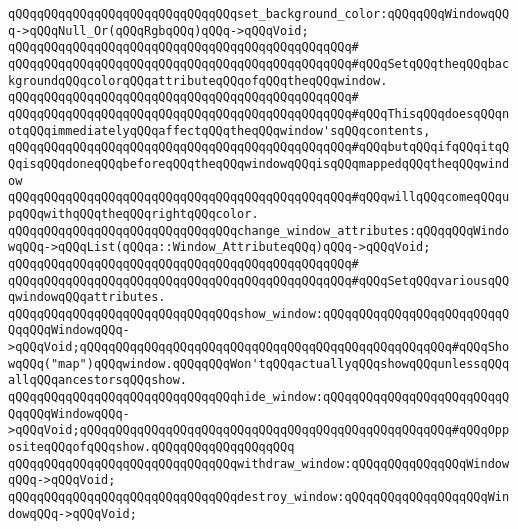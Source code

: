 \newline
\verb|qQQqqQQqqQQqqQQqqQQqqQQqqQQqqQQqset_background_color:qQQqqQQqWindowqQQq->qQQqNull_Or(qQQqRgbqQQq)qQQq->qQQqVoid;|\newline
\verb|qQQqqQQqqQQqqQQqqQQqqQQqqQQqqQQqqQQqqQQqqQQqqQQq#|\newline
\verb|qQQqqQQqqQQqqQQqqQQqqQQqqQQqqQQqqQQqqQQqqQQqqQQq#qQQqSetqQQqtheqQQqbackgroundqQQqcolorqQQqattributeqQQqofqQQqtheqQQqwindow.|\newline
\verb|qQQqqQQqqQQqqQQqqQQqqQQqqQQqqQQqqQQqqQQqqQQqqQQq#|\newline
\verb|qQQqqQQqqQQqqQQqqQQqqQQqqQQqqQQqqQQqqQQqqQQqqQQq#qQQqThisqQQqdoesqQQqnotqQQqimmediatelyqQQqaffectqQQqtheqQQqwindow'sqQQqcontents,|\newline
\verb|qQQqqQQqqQQqqQQqqQQqqQQqqQQqqQQqqQQqqQQqqQQqqQQq#qQQqbutqQQqifqQQqitqQQqisqQQqdoneqQQqbeforeqQQqtheqQQqwindowqQQqisqQQqmappedqQQqtheqQQqwindow|\newline
\verb|qQQqqQQqqQQqqQQqqQQqqQQqqQQqqQQqqQQqqQQqqQQqqQQq#qQQqwillqQQqcomeqQQqupqQQqwithqQQqtheqQQqrightqQQqcolor.|\newline
\newline
\newline
\verb|qQQqqQQqqQQqqQQqqQQqqQQqqQQqqQQqchange_window_attributes:qQQqqQQqWindowqQQq->qQQqList(qQQqa::Window_AttributeqQQq)qQQq->qQQqVoid;|\newline
\verb|qQQqqQQqqQQqqQQqqQQqqQQqqQQqqQQqqQQqqQQqqQQqqQQq#|\newline
\verb|qQQqqQQqqQQqqQQqqQQqqQQqqQQqqQQqqQQqqQQqqQQqqQQq#qQQqSetqQQqvariousqQQqwindowqQQqattributes.|\newline
\newline
\verb|qQQqqQQqqQQqqQQqqQQqqQQqqQQqqQQqshow_window:qQQqqQQqqQQqqQQqqQQqqQQqqQQqqQQqWindowqQQq->qQQqVoid;qQQqqQQqqQQqqQQqqQQqqQQqqQQqqQQqqQQqqQQqqQQqqQQqqQQq#qQQqShowqQQq("map")qQQqwindow.qQQqqQQqWon'tqQQqactuallyqQQqshowqQQqunlessqQQqallqQQqancestorsqQQqshow.|\newline
\verb|qQQqqQQqqQQqqQQqqQQqqQQqqQQqqQQqhide_window:qQQqqQQqqQQqqQQqqQQqqQQqqQQqqQQqWindowqQQq->qQQqVoid;qQQqqQQqqQQqqQQqqQQqqQQqqQQqqQQqqQQqqQQqqQQqqQQqqQQq#qQQqOppositeqQQqofqQQqshow.qQQqqQQqqQQqqQQqqQQq|\newline
\verb|qQQqqQQqqQQqqQQqqQQqqQQqqQQqqQQqwithdraw_window:qQQqqQQqqQQqqQQqWindowqQQq->qQQqVoid;|\newline
\verb|qQQqqQQqqQQqqQQqqQQqqQQqqQQqqQQqdestroy_window:qQQqqQQqqQQqqQQqqQQqWindowqQQq->qQQqVoid;|\newline
\newline
